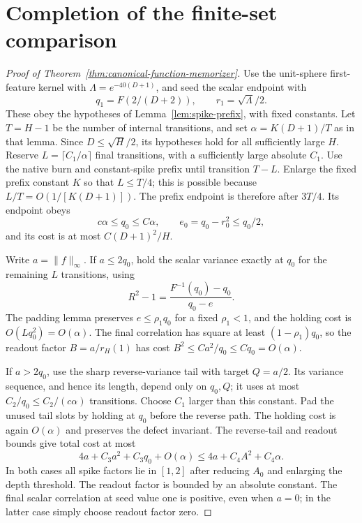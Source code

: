 \section{Completion of the finite-set comparison}
\begin{proof}[Proof of Theorem~\ref{thm:canonical-function-memorizer}]
Use the unit-sphere first-feature kernel with $\Lambda=e^{-40(D+1)}$, and seed the scalar endpoint with
\[
 q_1=F(2/(D+2)),\qquad r_1=\sqrt\Lambda/2.
\]
These obey the hypotheses of Lemma~\ref{lem:spike-prefix}, with fixed constants. Let $T=H-1$ be the number of internal transitions, and set
$\alpha=K(D+1)/T$ as in that lemma. Since $D\le\sqrt H/2$, its hypotheses hold for all sufficiently large $H$.
Reserve $L=\lceil C_1/\alpha\rceil$ final transitions, with a sufficiently large absolute $C_1$. Use the native burn and constant-spike prefix until transition $T-L$. Enlarge the fixed prefix constant $K$ so that $L\le T/4$; this is possible because $L/T=O(1/[K(D+1)])$. The prefix endpoint is therefore after $3T/4$. Its endpoint obeys
\[
 c\alpha\le q_0\le C\alpha,\qquad
 e_0=q_0-r_0^2\le q_0/2,
\]
and its cost is at most $C(D+1)^2/H$.

Write $a=\|f\|_\infty$. If $a\le2q_0$, hold the scalar variance exactly at $q_0$ for the remaining $L$ transitions, using
\[
 R^2-1=\frac{F^{-1}(q_0)-q_0}{q_0-e}.
\]
The padding lemma preserves $e\le\rho_1q_0$ for a fixed $\rho_1<1$, and the holding cost is $O(Lq_0^2)=O(\alpha)$. The final correlation has square at least $(1-\rho_1)q_0$, so the readout factor $B=a/r_H(1)$ has cost $B^2\le Ca^2/q_0\le Cq_0=O(\alpha)$.

If $a>2q_0$, use the sharp reverse-variance tail with target $Q=a/2$. Its variance sequence, and hence its length, depend only on $q_0,Q$; it uses at most $C_2/q_0\le C_2/(c\alpha)$ transitions. Choose $C_1$ larger than this constant. Pad the unused tail slots by holding at $q_0$ before the reverse path. The holding cost is again $O(\alpha)$ and preserves the defect invariant. The reverse-tail and readout bounds give total cost at most
\[
 4a+C_3a^2+C_3q_0+O(\alpha)
 \le4a+C_4A^2+C_4\alpha.
\]
In both cases all spike factors lie in $[1,2]$ after reducing $A_0$ and enlarging the depth threshold. The readout factor is bounded by an absolute constant. The final scalar correlation at seed value one is positive, even when $a=0$; in the latter case simply choose readout factor zero.


\end{proof}
